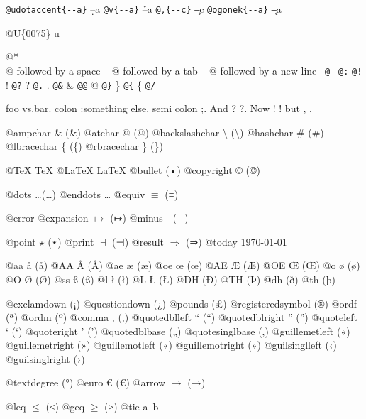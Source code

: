 \documentclass{book}
\renewcommand{\_}{\Texinfounderscore\discretionary{}{}{}}
\begin{document}
\texttt{@udotaccent\{{-}{-}a\}} \d{--a}
\texttt{@v\{{-}{-}a\}} \v{--a}
\texttt{@,\{{-}{-}c\}} \c{--c}
\texttt{@ogonek\{{-}{-}a\}} \k{--a}

@U\{0075\} u

@* \leavevmode{}\\
@ followed by a space
\ {}
@ followed by a tab
\ {}
@ followed by a new line
\ {}\texttt{@-} \-{}
\texttt{@:} \@
\texttt{@!} \@!
\texttt{@?} \@?
\texttt{@.} \@.
\texttt{@\&} \&
\texttt{@@} @
\texttt{@\}} \}
\texttt{@\{} \{
\texttt{@/} 

foo vs.\@ bar. 
colon :\@And something else.
semi colon ;\@.
And ? ?\@.
Now ! !\@@
but , ,\@

@ampchar \& (\&)
@atchar @ (@)
@backslashchar \textbackslash{} (\textbackslash{})
@hashchar \# (\#)
@lbracechar \{ (\{)
@rbracechar \} (\})

@TeX \TeX{}
@LaTeX \LaTeX{}
@bullet \textbullet{} (•)
@copyright \copyright{} (©)

@dots \dots{}\@ (…)
@enddots \dots{}
@equiv $\equiv{}$ (≡)

@error 
@expansion $\mapsto{}$ (↦)
@minus - (−)

@point $\star{}$ (⋆)
@print $\dashv{}$ (⊣)
@result $\Rightarrow{}$ (⇒)
@today \today{}

@aa \aa{} (å)
@AA \AA{} (Å)
@ae \ae{} (æ)
@oe \oe{} (œ)
@AE \AE{} (Æ)
@OE \OE{} (Œ)
@o \o{} (ø)
@O \O{} (Ø)
@ss \ss{} (ß)
@l \l{} (ł)
@L \L{} (Ł)
@DH \DH{} (Ð)
@TH \TH{} (Þ)
@dh \dh{} (ð)
@th \th{} (þ)

@exclamdown \textexclamdown{} (¡)
@questiondown \textquestiondown{} (¿)
@pounds \textsterling{} (£)
@registeredsymbol \circledR{} (®)
@ordf \textordfeminine{} (ª)
@ordm \textordmasculine{} (º)
@comma , (,)
@quotedblleft \textquotedblleft{} (“)
@quotedblright \textquotedblright{} (”)
@quoteleft \textquoteleft{} (‘)
@quoteright \textquoteright{} (’)
@quotedblbase \quotedblbase{} („)
@quotesinglbase \quotesinglbase{} (‚)
@guillemetleft \guillemotleft{} («)
@guillemetright \guillemotright{} (»)
@guillemotleft \guillemotleft{} («)
@guillemotright \guillemotright{} (»)
@guilsinglleft \guilsinglleft{} (‹)
@guilsinglright \guilsinglright{} (›)

@textdegree \textdegree{} (°)
@euro \euro{} (€)
@arrow $\rightarrow{}$ (→)

@leq $\leq{}$ (≤)
@geq $\geq{}$ (≥)
@tie a~b
\end{document}
